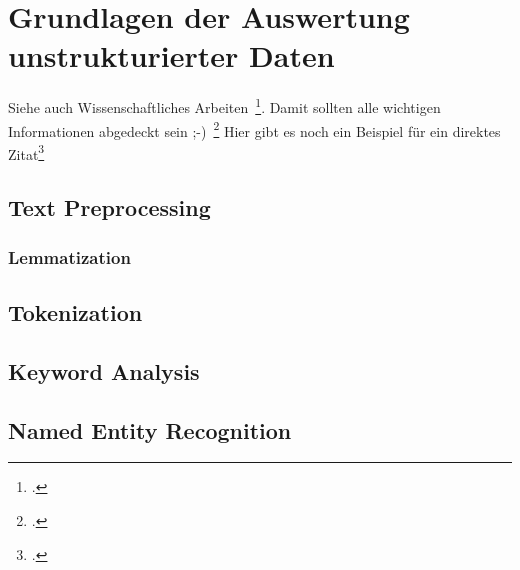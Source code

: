 \newpage
\section{Grundlagen der Auswertung unstrukturierter Daten} \label{infos}
Siehe auch Wissenschaftliches Arbeiten~\footcite[\vglf][S. 1]{savic_chronic_2020}. %
Damit sollten alle wichtigen Informationen abgedeckt sein ;-)~\footcite[\vglf][]{Balzert.2008} %
Hier gibt es noch ein Beispiel für ein direktes Zitat\footcite[][]{Balzert.2008} %

\subsection{Text Preprocessing}
\subsubsection{Lemmatization}
\subsection{Tokenization}
\subsection{Keyword Analysis}
\subsection{Named Entity Recognition}